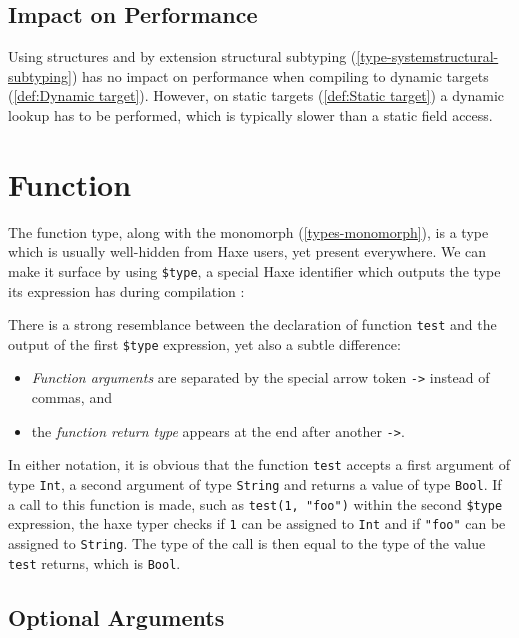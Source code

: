 \documentclass[a4paper,oneside]{book}
\newcommand{\type}[1]{\texttt{#1}}
\newcommand{\expr}[1]{\texttt{#1}}
\newcommand{\tref}[2]{#1 (\ref{#2})}
\newcommand{\haxe}[2][]{%
}
\begin{document}

\subsection{Impact on Performance}
\label{types-structure-performance}

Using structures and by extension \tref{structural subtyping}{type-systemstructural-subtyping} has no impact on performance when compiling to \tref{dynamic targets}{def:Dynamic target}. However, on \tref{static targets}{def:Static target} a dynamic lookup has to be performed, which is typically slower than a static field access.



\section{Function}
\label{types-function}

The function type, along with the \tref{monomorph}{types-monomorph}, is a type which is usually well-hidden from Haxe users, yet present everywhere. We can make it surface by using \expr{\$type}, a special Haxe identifier which outputs the type its expression has during compilation :

\haxe{assets/FunctionType.hx}

There is a strong resemblance between the declaration of function \expr{test} and the output of the first \expr{\$type} expression, yet also a subtle difference:

\begin{itemize}
	\item \emph{Function arguments} are separated by the special arrow token \expr{->} instead of commas, and
	\item the \emph{function return type} appears at the end after another \expr{->}.
\end{itemize}
In either notation, it is obvious that the function \expr{test} accepts a first argument of type \type{Int}, a second argument of type \type{String} and returns a value of type \type{Bool}. If a call to this function is made, such as \expr{test(1, "foo")} within the second \expr{\$type} expression, the haxe typer checks if \expr{1} can be assigned to \type{Int} and if \expr{"foo"} can be assigned to \type{String}. The type of the call is then equal to the type of the value \expr{test} returns, which is \type{Bool}.


\subsection{Optional Arguments}
\label{types-function-optional-arguments}
\end{document}
